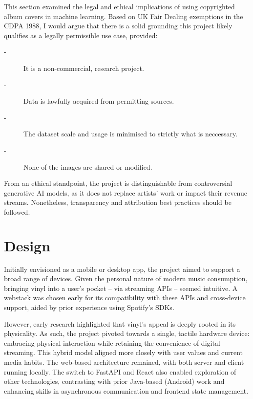                   This section examined the legal and ethical implications of using copyrighted album covers in machine learning. Based on UK Fair Dealing exemptions in the CDPA 1988, I would argue that there is a solid grounding this project likely qualifies as a legally permissible use case, provided:
                  \begin{description}
                      \item[-] It is a non-commercial, research project.
                      \item[-] Data is lawfully acquired from permitting sources.
                      \item[-] The dataset scale and usage is minimised to strictly what is neccessary.
                      \item[-] None of the images are shared or modified. %
                  \end{description}
                  
                  From an ethical standpoint, the project is distinguishable from controversial generative AI models, as it does not replace artists’ work or impact their revenue streams. Nonetheless, transparency and attribution best practices should be followed.
    
    \section{Design} %
    
        Initially envisioned as a mobile or desktop app, the project aimed to support a broad range of devices. Given the personal nature of modern music consumption, bringing vinyl into a user’s pocket -- via streaming APIs -- seemed intuitive. A webstack was chosen early for its compatibility with these APIs and cross-device support, aided by prior experience using Spotify’s SDKs.
    
        However, early research highlighted that vinyl’s appeal is deeply rooted in its physicality. As such, the project pivoted towards a single, tactile hardware device: embracing physical interaction while retaining the convenience of digital streaming. This hybrid model aligned more closely with user values and current media habits. The web-based architecture remained, with both server and client running locally. The switch to FastAPI and React also enabled exploration of other technologies, contrasting with prior Java-based (Android) work and enhancing skills in asynchronous communication and frontend state management.
    
